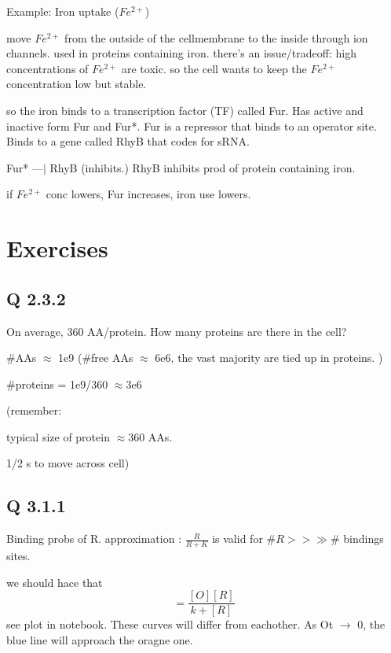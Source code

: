 \documentclass{article}
\begin{document}
Example: Iron uptake ($Fe^{2+}$)

move $Fe^{2+} $ from the outside of the cellmembrane to the inside through ion channels. used in proteins containing iron. 
there's an issue/tradeoff: high concentrations of $Fe^{2+} $ are toxic. so the cell wants to keep the $Fe^{2+} $ concentration low but stable.

so the iron binds to a transcription factor (TF) called Fur. Has active and inactive form Fur and Fur*. Fur is a repressor that binds to an operator site. Binds to a gene called RhyB that codes for sRNA. 

Fur* ---$|$ RhyB (inhibits.)
RhyB inhibits prod of protein containing iron. 


if $Fe^{2+} $ conc lowers, Fur increases, iron use lowers. 


\section{Exercises}
\subsection{Q 2.3.2}
On average, 360 AA/protein. How many proteins are there in the cell? 

\#AAs $\approx$ 1e9
(\#free AAs $\approx$ 6e6, the vast majority are tied up in proteins. )

\#proteins = 1e9/360 $\approx$3e6

(remember:

typical size of protein $\approx 360$ AAs.

1/2 s to move across cell)

\subsection{Q 3.1.1}
Binding probs of R. 
approximation :  $\frac{R}{R+K}$ is valid for $\#R>> \gg\#$ bindings sites.

we should hace that 
\begin{equation}
	[OR] = \frac{[O][R]}{k + [R]}
\end{equation}
see plot in notebook. These curves will differ from eachother. As Ot $\longrightarrow$ 0, the blue line will approach the oragne one. 
\end{document}

